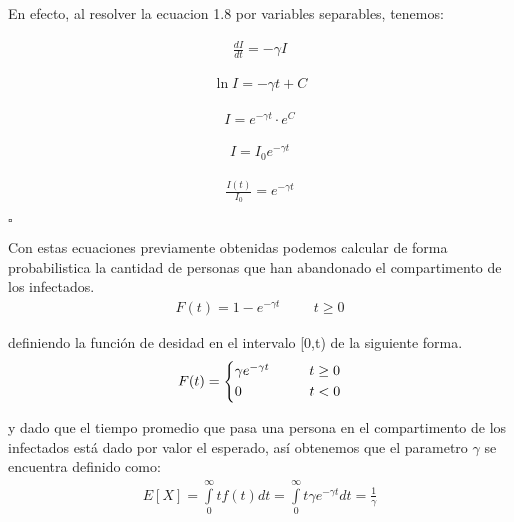 \begin{Dem}
En efecto, al resolver la ecuacion 1.8 por variables separables, tenemos: 

\begin{align*}
\frac{dI}{dt} = - \gamma I
\end{align*}

\begin{align*}
\ln{I} = - \gamma t + C
\end{align*}

\begin{align*}
I = e^{- \gamma t} \cdot e^{C}
\end{align*}

\begin{align*}
I = I_{0} e^{- \gamma t}
\end{align*}

\begin{align*}
\frac{I(t)}{I_{0}} = e^{-\gamma t}
\end{align*}

\hfill	$\square$

\end{Dem}

Con estas ecuaciones previamente obtenidas podemos calcular de forma probabilistica la cantidad de personas que han abandonado el compartimento de los infectados.
\begin{align}
F(t) = 1 -  e^{-\gamma t} \hspace{1cm} t \geq  0
\end{align}

definiendo la función de desidad en el intervalo [0,t) de la siguiente forma.\\
\begin{equation*}
F(t) =
\begin{cases*}
\gamma e^{-\gamma t} \hspace{1cm} t \geq  0 \\
0 \hspace{1.7cm} t <  0
\end{cases*}
\end{equation*}

y dado que el tiempo promedio que pasa una persona en el compartimento de los infectados está dado por valor el esperado, así obtenemos que el parametro $\gamma$ se encuentra definido como: \\

\begin{align}
E[X] = \int \limits_{0}^{\infty} tf(t)dt = \int \limits_{0}^{\infty} t\gamma e^{-\gamma t} dt = \frac{1}{\gamma}
\end{align}

